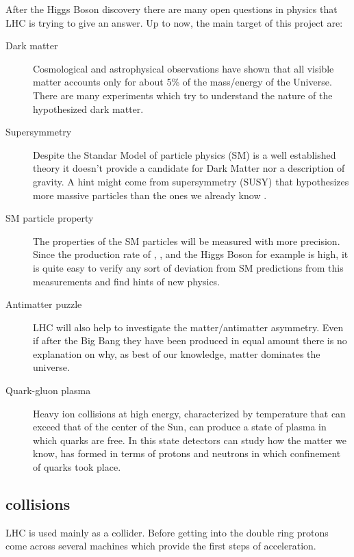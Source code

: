After the Higgs Boson discovery there are many open questions in physics that LHC is trying to give an answer. Up to now, the main target of this project are:
\begin{description}
\item[Dark matter] Cosmological and astrophysical observations have shown that all visible matter accounts only for about 5\% of the mass/energy of the Universe. There are many experiments which try to understand the nature of the hypothesized dark matter.
\item[Supersymmetry] Despite the Standar Model of particle physics (SM) is a well established theory it doesn't provide a candidate for Dark Matter nor a description of gravity. A hint might come from supersymmetry (SUSY) that hypothesizes more massive particles than the ones we already know \cite{SSMPrimer}.
\item[SM particle property] The properties of the SM particles will be measured with more precision. Since the production rate of \Wboson, \Zboson, \ttbar and the Higgs Boson for example is high, it is quite easy to verify any sort of deviation from SM predictions from this measurements and find hints of new physics.
\item[Antimatter puzzle] LHC will also help to investigate the matter/antimatter asymmetry. Even if after the Big Bang they have been produced in equal amount there is no explanation on why, as best of our knowledge, matter dominates the universe.
\item[Quark-gluon plasma] Heavy ion collisions at high energy, characterized by temperature that can exceed that of the center of the Sun, can produce a state of plasma in which quarks are free. In this state detectors can study how the matter we know, has formed in terms of protons and neutrons in which confinement of quarks took place.
\end{description}

\subsection{\pp collisions}
LHC is used mainly as a \pp collider. Before getting into the double ring protons come across several machines which provide the first steps of acceleration.

